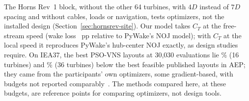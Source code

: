 The Horns Rev~1 block, without the other 64 turbines, with $4D$ instead of $7D$ spacing and without cables, loads or navigation, tests optimizers, not the installed design (Section~\ref{sec:hornsrev-site}). Our model takes $C_T$ at the free-stream speed (wake loss \NFPyWakeLossDiffPP~pp relative to PyWake's NOJ model); with $C_T$ at the local speed it reproduces PyWake's hub-center NOJ exactly, as design studies require. On IEA37, the best PSO-VNS layouts at 30,030 evaluations lie \NFIEAGapSixteenThirtyKProj\% (16 turbines) and \NFIEAGapThirtySixThirtyKProj\% (36 turbines) below the best feasible published layouts in AEP; they came from the participants' own optimizers, some gradient-based, with budgets not reported comparably~\cite{Baker2019,Thomas2023}. The methods compared here, at these budgets, are reference points for comparing optimizers, not design tools.

